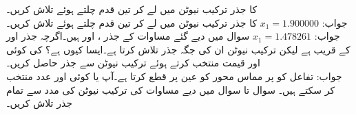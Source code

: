 \quad
{} کا جذر ترکیب نیوٹن میں  لے کر تین قدم چلتے ہوئے  تلاش کریں۔\\
جواب:\quad 
$x_1=\num{1.900000}$
\quad
{} کا جذر ترکیب نیوٹن میں  لے کر تین قدم چلتے ہوئے تلاش کریں۔\\
جواب:\quad
$x_1=\num{1.478261}$
\quad
سوال  میں دیے گئے مساوات کے جذر ،  اور  ہیں۔اگرچہ  جذر  اور  کے قریب ہے لیکن ترکیب نیوٹن ان کی جگہ جذر  تلاش کرتا ہے۔ایسا کیوں ہے؟  کی کوئی اور قیمت منتخب کرتے ہوئے ترکیب نیوٹن سے جذر  حاصل کریں۔\\
جواب:\quad
تفاعل  کو  پر مماس محور  کو عین  پر قطع کرتا ہے۔آپ  یا کوئی اور عدد منتخب کر سکتے ہیں۔
سوال  تا سوال  میں  دیے مساوات کی ترکیب نیوٹن کی مدد سے تمام جذر تلاش کریں۔

